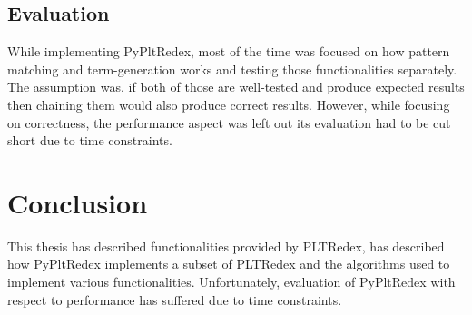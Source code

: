 \subsection{Evaluation}
While implementing PyPltRedex, most of the time was focused on how pattern matching and term-generation works and testing those functionalities separately. The assumption was, if both of those are well-tested and produce expected results then chaining them would also produce correct results. However, while focusing on correctness, the performance aspect was left out its evaluation had to be cut short due to time constraints. 

\section{Conclusion}
This thesis has described functionalities provided by PLTRedex, has described how PyPltRedex implements a subset of PLTRedex and the algorithms used to implement various functionalities. Unfortunately, evaluation of PyPltRedex with respect to performance has suffered due to time constraints.
